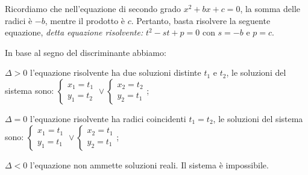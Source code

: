 Ricordiamo che nell’equazione di secondo grado $x^2+bx+c=0$, la somma delle radici è $-b$, mentre il prodotto è $c$. Pertanto, basta risolvere la seguente equazione, \emph{detta equazione risolvente: } $t^2-st+p=0$ con $s=-b$ e $p=c$.

In base al segno del discriminante abbiamo:
\begin{itemize*}
\item $\Delta >0$ l'equazione risolvente ha due soluzioni distinte $ t_1 $ e $ t_2 $, le soluzioni del sistema sono: $\left\{\begin{array}{l}{x_1=t_1}\\{y_1=t_2}\end{array}\right.\vee \left\{\begin{array}{l}{x_2=t_2}\\{y_2=t_1}\end{array}\right.$;
\item $\Delta =0$ l'equazione risolvente ha radici coincidenti $t_1=t_2$, le soluzioni del sistema sono: $\left\{\begin{array}{l}{x_1=t_1}\\{y_1=t_1}\end{array}\right.\vee \left\{\begin{array}{l}{x_2=t_1}\\{y_2=t_1}\end{array}\right.$;
\item $\Delta <0$ l'equazione non ammette soluzioni reali. Il sistema è impossibile.
\end{itemize*}

